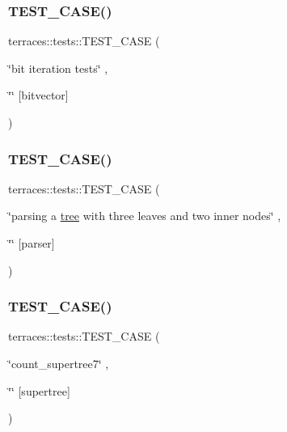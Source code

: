 \subsubsection{\texorpdfstring{T\+E\+S\+T\+\_\+\+C\+A\+S\+E()}{TEST\_CASE()}\hspace{0.1cm}{\footnotesize\ttfamily [39/78]}}
{\footnotesize\ttfamily terraces\+::tests\+::\+T\+E\+S\+T\+\_\+\+C\+A\+SE (\begin{DoxyParamCaption}\item[{\char`\"{}bit iteration tests\char`\"{}}]{,  }\item[{\char`\"{}\char`\"{}}]{\mbox{[}bitvector\mbox{]} }\end{DoxyParamCaption})}

\mbox{\label{namespaceterraces_1_1tests_a3f8d7bde6f8a6617b4a76d6141dcdd61}} 
\subsubsection{\texorpdfstring{T\+E\+S\+T\+\_\+\+C\+A\+S\+E()}{TEST\_CASE()}\hspace{0.1cm}{\footnotesize\ttfamily [40/78]}}
{\footnotesize\ttfamily terraces\+::tests\+::\+T\+E\+S\+T\+\_\+\+C\+A\+SE (\begin{DoxyParamCaption}\item[{\char`\"{}parsing a \hyperlink{namespaceterraces_a07aaf7feec4a22c6cdefc14c5a81bdd0}{tree} with three leaves and two inner nodes\char`\"{}}]{,  }\item[{\char`\"{}\char`\"{}}]{\mbox{[}parser\mbox{]} }\end{DoxyParamCaption})}

\mbox{\label{namespaceterraces_1_1tests_ad156ba4021b3161f1379bcc7ee1d22f1}} 
\subsubsection{\texorpdfstring{T\+E\+S\+T\+\_\+\+C\+A\+S\+E()}{TEST\_CASE()}\hspace{0.1cm}{\footnotesize\ttfamily [41/78]}}
{\footnotesize\ttfamily terraces\+::tests\+::\+T\+E\+S\+T\+\_\+\+C\+A\+SE (\begin{DoxyParamCaption}\item[{\char`\"{}count\+\_\+supertree7\char`\"{}}]{,  }\item[{\char`\"{}\char`\"{}}]{\mbox{[}supertree\mbox{]} }\end{DoxyParamCaption})}


